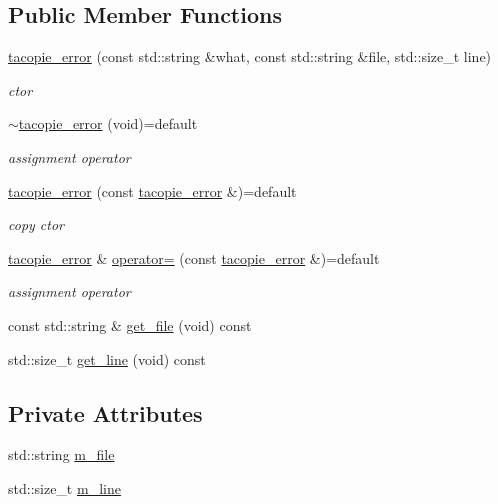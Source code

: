\subsection*{Public Member Functions}
\begin{DoxyCompactItemize}
\item 
\hyperlink{classtacopie_1_1tacopie__error_a524fb8e9ac1825a57664421a3f32b9ce}{tacopie\+\_\+error} (const std\+::string \&what, const std\+::string \&file, std\+::size\+\_\+t line)
\begin{DoxyCompactList}\small\item\em ctor \end{DoxyCompactList}\item 
\hyperlink{classtacopie_1_1tacopie__error_a5bf6b0967f7f4cf2b8f8d0a2ef0912b2}{$\sim$tacopie\+\_\+error} (void)=default
\begin{DoxyCompactList}\small\item\em assignment operator \end{DoxyCompactList}\item 
\hyperlink{classtacopie_1_1tacopie__error_a0cb2a911165e08818ca03308891633e1}{tacopie\+\_\+error} (const \hyperlink{classtacopie_1_1tacopie__error}{tacopie\+\_\+error} \&)=default
\begin{DoxyCompactList}\small\item\em copy ctor \end{DoxyCompactList}\item 
\hyperlink{classtacopie_1_1tacopie__error}{tacopie\+\_\+error} \& \hyperlink{classtacopie_1_1tacopie__error_ad30ae4932d33b460f75570f5f3a6e3f3}{operator=} (const \hyperlink{classtacopie_1_1tacopie__error}{tacopie\+\_\+error} \&)=default
\begin{DoxyCompactList}\small\item\em assignment operator \end{DoxyCompactList}\item 
const std\+::string \& \hyperlink{classtacopie_1_1tacopie__error_a10360163c780a1bd9c95fcecca5aa6da}{get\+\_\+file} (void) const
\item 
std\+::size\+\_\+t \hyperlink{classtacopie_1_1tacopie__error_a39704d2cb6f076aa47d45f53f174b257}{get\+\_\+line} (void) const
\end{DoxyCompactItemize}
\subsection*{Private Attributes}
\begin{DoxyCompactItemize}
\item 
std\+::string \hyperlink{classtacopie_1_1tacopie__error_a34c06192d25e3c78b1aed8b0c2ead413}{m\+\_\+file}
\item 
std\+::size\+\_\+t \hyperlink{classtacopie_1_1tacopie__error_a1631d3a1ba6d610e6c6ab0ddaf70b354}{m\+\_\+line}
\end{DoxyCompactItemize}


